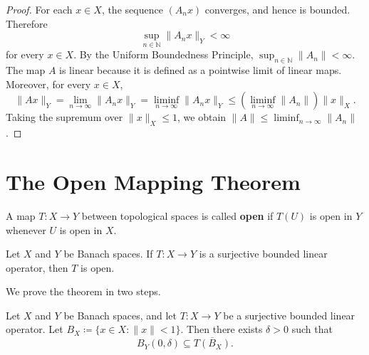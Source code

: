 \begin{proof}
    For each \(x \in X\), the sequence \((A_n x)\) converges, and hence is bounded. Therefore
    \[
        \sup_{n \in \mathbb{N}} \lVert A_n x \rVert_Y < \infty
    \]
    for every \(x \in X\). By the Uniform Boundedness Principle, \(\sup_{n \in \mathbb{N}} \lVert A_n \rVert < \infty\). The map \(A\) is linear because it is defined as a pointwise limit of linear maps. Moreover, for every \(x \in X\),
    \[
        \lVert Ax \rVert_Y = \lim_{n \to \infty} \lVert A_n x \rVert_Y = \liminf_{n \to \infty} \lVert A_n x \rVert_Y \leq \left( \liminf_{n \to \infty} \lVert A_n \rVert \right) \lVert x \rVert_X.
    \]
    Taking the supremum over \(\lVert x \rVert_X \leq 1\), we obtain \(\lVert A \rVert \leq \liminf_{n \to \infty} \lVert A_n \rVert\).
\end{proof}

\section{The Open Mapping Theorem}
A map \(T : X \to Y\) between topological spaces is called \textbf{open} if \(T(U)\) is open in \(Y\) whenever \(U\) is open in \(X\).

\begin{theorem} \label{thm: open mapping theorem}
    Let \(X\) and \(Y\) be Banach spaces. If \(T : X \to Y\) is a surjective bounded linear operator, then \(T\) is open.
\end{theorem}

We prove the theorem in two steps.

\begin{lemma} \label{lm: open mapping step 1}
    Let \(X\) and \(Y\) be Banach spaces, and let \(T : X \to Y\) be a surjective bounded linear operator. Let \(B_X \coloneqq \{x \in X : \lVert x \rVert < 1\}\). Then there exists \(\delta > 0\) such that
    \[
        B_Y(0, \delta) \subseteq \overline{T(B_X)}.
    \]
\end{lemma}

